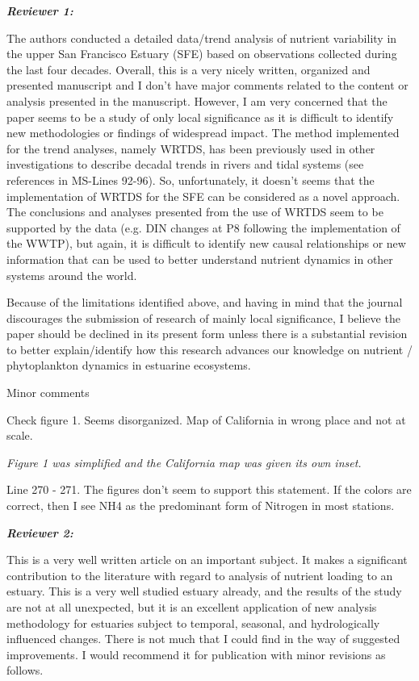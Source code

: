 \documentclass[letterpaper,12pt]{article}
\newcommand{\Bigtxt}[1]{\textbf{\textit{#1}}}
\begin{document}
\Bigtxt{Reviewer 1:}

The authors conducted a detailed data/trend analysis of nutrient variability in the upper San Francisco Estuary (SFE) based on observations collected during the last four decades. Overall, this is a very nicely written, organized and presented manuscript and I don't have major comments related to the content or analysis presented in the manuscript. However, I am very concerned that the paper seems to be a study of only local significance as it is difficult to identify new methodologies or findings of widespread impact. The method implemented for the trend analyses, namely WRTDS, has been previously used in other investigations to describe decadal trends in rivers and tidal systems (see references in MS-Lines 92-96). So, unfortunately, it doesn't seems that the implementation of WRTDS for the SFE can be considered as a novel approach. The conclusions and analyses presented from the use of WRTDS seem to be supported by the data (e.g. DIN changes at P8 following the implementation of the WWTP), but again, it is difficult to identify new causal relationships or new information that can be used to better understand nutrient dynamics in other systems around the world.  

Because of the limitations identified above, and having in mind that the journal discourages the submission of research of mainly local significance, I believe the paper should be declined in its present form unless there is a substantial revision to better explain/identify how this research advances our knowledge on nutrient / phytoplankton dynamics in estuarine ecosystems. 

Minor comments

Check figure 1. Seems disorganized. Map of California in wrong place and not at scale.

{\it Figure 1 was simplified and the California map was given its own inset.}

Line  270 - 271. The figures don't seem to support this statement. If the colors are correct, then I see NH4 as the predominant form of Nitrogen in most stations. 


\Bigtxt{Reviewer 2:}

This is a very well written article on an important subject.  It makes a significant contribution to the literature with regard to analysis of nutrient loading to an estuary.  This is a very well studied estuary already, and the results of the study are not at all unexpected, but it is an excellent application of new analysis methodology for estuaries subject to temporal, seasonal, and hydrologically influenced changes.  There is not much that I could find in the way of suggested improvements.  I would recommend it for publication with minor revisions as follows.
\end{document}
